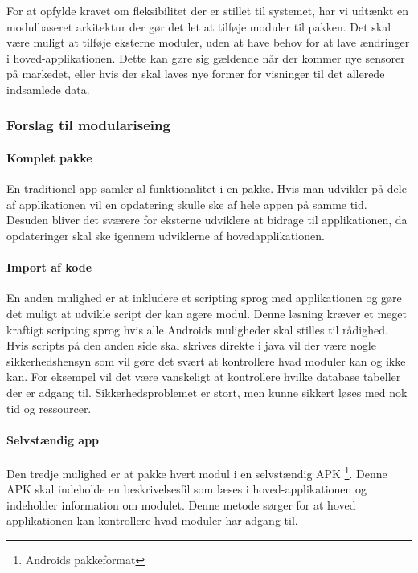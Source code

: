 
For at opfylde kravet om fleksibilitet der er stillet til systemet, har vi udtænkt en modulbaseret arkitektur der gør det let at tilføje moduler til pakken.
Det skal være muligt at tilføje eksterne moduler, uden at have behov for at lave ændringer i hoved-applikationen.
Dette kan gøre sig gældende når der kommer nye sensorer på markedet, eller hvis der skal laves nye former for visninger til det allerede indsamlede data.
\subsubsection{Forslag til modulariseing}
\paragraph{Komplet pakke}
En traditionel app samler al funktionalitet i en pakke.
Hvis man udvikler på dele af applikationen vil en opdatering skulle ske af hele appen på samme tid.
Desuden bliver det sværere for eksterne udviklere at bidrage til applikationen, da opdateringer skal ske igennem udviklerne af hovedapplikationen.

\paragraph{Import af kode}
En anden mulighed er at inkludere et scripting sprog med applikationen og gøre det muligt at udvikle script der kan agere modul.
Denne løsning kræver et meget kraftigt scripting sprog hvis alle Androids muligheder skal stilles til rådighed.
Hvis scripts på den anden side skal skrives direkte i java vil der være nogle sikkerhedshensyn som vil gøre det svært at kontrollere hvad moduler kan og ikke kan.
For eksempel vil det være vanskeligt at kontrollere hvilke database tabeller der er adgang til.
Sikkerhedsproblemet er stort, men kunne sikkert løses med nok tid og ressourcer.

\paragraph{Selvstændig app}
Den tredje mulighed er at pakke hvert modul i en selvstændig APK \footnote{Androids pakkeformat}.
Denne APK skal indeholde en beskrivelsesfil som læses i hoved-applikationen og indeholder information om modulet.
Denne metode sørger for at hoved applikationen kan kontrollere hvad moduler har adgang til. 

